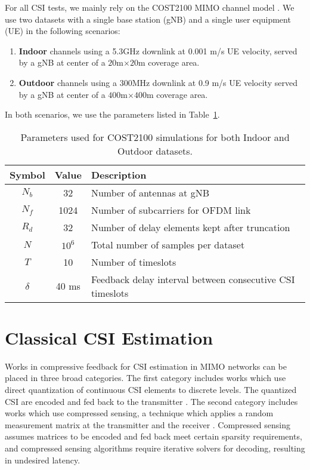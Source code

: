 For all CSI tests, we mainly rely on the COST2100 MIMO channel model \cite{ref:liu2012cost2100}. We use two datasets with a single base station (gNB) and a single user equipment (UE) in the following scenarios:
\begin{enumerate}
	\item \textbf{Indoor} channels using a 5.3GHz downlink at
	0.001 m/s UE velocity, served by a
	gNB at center of a $20$m$\times 20$m coverage area.
	\item \textbf{Outdoor} channels using a 300MHz downlink at 0.9 m/s UE velocity served by a gNB at center 
	of a $400$m$\times 400$m coverage area.
\end{enumerate}
In both scenarios, we use the parameters listed in Table~\ref{tab:cost-params}.
\begin{table}[]
\centering
\caption{Parameters used for COST2100 simulations for both Indoor and Outdoor datasets.}
\label{tab:cost-params}
\begin{tabular}{c|c|l}
\toprule
\textbf{Symbol} & \textbf{Value} & \textbf{Description} \\ \midrule
$N_b$ 			& 32			 & Number of antennas at gNB  \\ \hline
$N_f$ 			& 1024			 & Number of subcarriers for OFDM link  \\ \hline
$R_d$ 			& 32			 & Number of delay elements kept after truncation  \\ \hline
$N$ 			& $10^6$		 & Total number of samples per dataset  \\ \hline
$T$ 			& 10		 	 & Number of timeslots  \\ \hline
$\delta$		& 40 ms			 & Feedback delay interval between consecutive CSI timeslots  \\ \bottomrule
\end{tabular}
\end{table}

\section{Classical CSI Estimation}
\label{sect:classic_estimation}

Works in compressive feedback for CSI estimation in MIMO networks can be placed in three broad categories. The first category includes works which use direct quantization of continuous CSI elements to discrete levels. The quantized CSI are encoded and fed back to the transmitter \cite{ref:makki2012hybrid,ref:shirani2009channel}. The second category includes works which use compressed sensing, a technique which applies a random measurement matrix at the transmitter and the receiver \cite{ref:rao2014distributed, ref:eltayeb2014compressive}. Compressed sensing assumes matrices to be encoded and fed back meet certain sparsity requirements, and compressed sensing algorithms require iterative solvers \cite{ref:do2008sparsity} for decoding, resulting in undesired latency.

